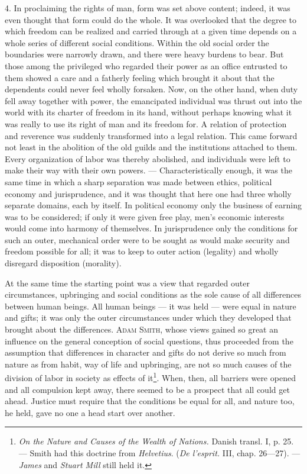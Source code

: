 \documentclass[12pt,a4paper,openany]{book}
\newcommand{\opage}[1]{\marginnote{\footnotesize\textit{[#1]}}}
\begin{document}
4. In proclaiming the rights of man, form was set above content; indeed, it was even thought that form could do the
whole. It was overlooked that the degree to which freedom can be realized and carried through at a given time depends on
a whole series of different social conditions. Within the old social order the boundaries were narrowly drawn, and there
were heavy burdens to bear. But those among the privileged who regarded their power as an office entrusted to them showed
a care and a fatherly feeling which brought it about that the dependents could never feel wholly forsaken. Now, on the
other hand, when duty fell away together with power, the emancipated individual was thrust out into the world with its
charter of freedom in its hand, without perhaps knowing what it was really to use its right of man and its freedom for. A
relation of protection and reverence was suddenly transformed into a legal relation. This came forward not least in the
abolition of the old guilds and the institutions attached to them. Every organization of labor was thereby abolished,
and individuals were left to make their way with their own powers. --- Characteristically enough, it was the same time
in which a sharp separation was made between ethics, political economy and jurisprudence, and it was thought that here
one had three wholly separate domains, each by itself.
\opage{353}In political economy only the business of earning was to be considered; if only it were given free play,
men's economic interests would come into harmony of themselves. In jurisprudence only the conditions for such an outer,
mechanical order were to be sought as would make security and freedom possible for all; it was to keep to outer action
(legality) and wholly disregard disposition (morality).

At the same time the starting point was a view that regarded outer circumstances, upbringing and social conditions as
the sole cause of all differences between human beings. All human beings --- it was held --- were equal in nature and
gifts; it was only the outer circumstances under which they developed that brought about the differences. \textsc{Adam
Smith}, whose views gained so great an influence on the general conception of social questions, thus proceeded from the
assumption that differences in character and gifts do not derive so much from nature as from habit, way of life and
upbringing, are not so much causes of the division of labor in society as effects of it\footnote[1]{\textit{On the Nature
and Causes of the Wealth of Nations.} Danish transl. I, p. 25. --- Smith had this doctrine from \emph{Helvetius}.
(\textit{De l'esprit.} III, chap. 26---27). --- \emph{James} and \emph{Stuart Mill} still held it.}. When, then, all barriers were opened and all
compulsion kept away, there seemed to be a prospect that all could get ahead. Justice must require that the conditions
be equal for all, and nature too, he held, gave no one a head start over another.
\end{document}

